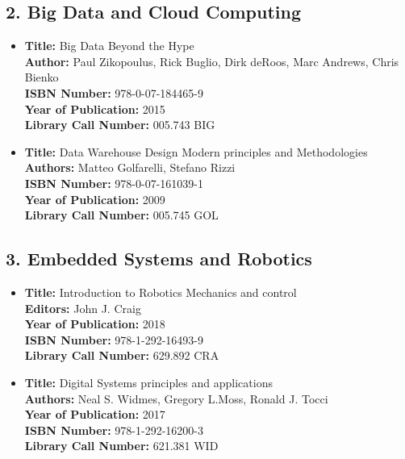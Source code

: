 \documentclass[11pt]{article}
\begin{document}
\subsection*{2. Big Data and Cloud Computing}
\begin{itemize}
    \item \textbf{Title:} Big Data Beyond the Hype \\
    \textbf{Author:} Paul Zikopoulus, Rick Buglio, Dirk deRoos, Marc Andrews, Chris Bienko\\
    \textbf{ISBN Number:}  978-0-07-184465-9 \\
    \textbf{Year of Publication:} 2015 \\
    \textbf{Library Call Number:} 005.743 BIG\\
    
    \item \textbf{Title:} Data Warehouse Design Modern principles and Methodologies \\
    \textbf{Authors:} Matteo Golfarelli, Stefano Rizzi \\
    \textbf{ISBN Number:} 978-0-07-161039-1 \\
    \textbf{Year of Publication:} 2009 \\
    \textbf{Library Call Number:} 005.745 GOL\\
\end{itemize}

\subsection*{3. Embedded Systems and Robotics}
\begin{itemize}
    \item \textbf{Title:} Introduction to Robotics Mechanics and control\\
    \textbf{Editors:} John J. Craig  \\
    \textbf{Year of Publication:} 2018 \\
    \textbf{ISBN Number:} 978-1-292-16493-9 \\
    \textbf{Library Call Number:} 629.892 CRA\\
    
    \item \textbf{Title:} Digital Systems principles and applications \\
    \textbf{Authors:} Neal S. Widmes, Gregory L.Moss, Ronald J. Tocci\\
    \textbf{Year of Publication:} 2017 \\
    \textbf{ISBN Number:} 978-1-292-16200-3 \\
    \textbf{Library Call Number:} 621.381 WID\\
\end{itemize}
\end{document}
